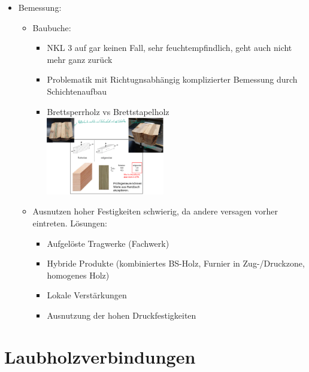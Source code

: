 \documentclass[fleqn,twoside]{article}
\begin{document}
\begin{itemize}
                \item Bemessung:
                    \begin{itemize}
                        \item Baubuche: 
                            \begin{itemize}
                                \item NKL 3 auf gar keinen Fall, sehr feuchtempfindlich, geht auch nicht mehr ganz zurück
                                \item Problematik mit Richtugnsabhängig komplizierter Bemessung durch Schichtenaufbau
                                \item Brettsperrholz vs Brettstapelholz \\
                                    \includegraphics[width=0.45\textwidth]{Grafiken/Laubholz/Baubuche Brettsperr-Brettstapel.png}
                            \end{itemize}
                        \item Ausnutzen hoher Festigkeiten schwierig, da andere versagen vorher eintreten. Lösungen:
                            \begin{itemize}
                                \item Aufgelöste Tragwerke (Fachwerk)
                                \item Hybride Produkte (kombiniertes BS-Holz, Furnier in Zug-/Druckzone, homogenes Holz)
                                \item Lokale Verstärkungen
                                \item Ausnutzung der hohen Druckfestigkeiten
                            \end{itemize}
                    \end{itemize}
        \end{itemize}
\newpage
\section{Laubholzverbindungen}
\end{document}
